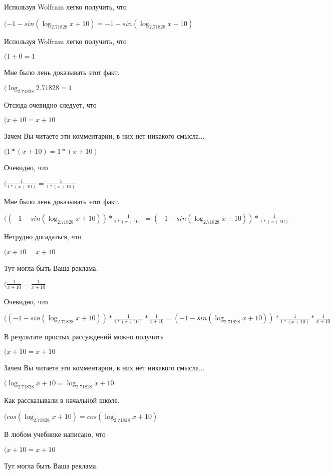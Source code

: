 \documentclass[12pt,a4paper,fleqn]{article}
\theoremstyle{definition}
\begin{document}
Используя Wolfram легко получить, что

$( -1  - sin(\log_{ 2.71828 }{ x  +  10 }) =  -1  - sin(\log_{ 2.71828 }{ x  +  10 })$

Используя Wolfram легко получить, что

$( 1  +  0  =  1 $

Мне было лень доказывать этот факт.

$(\log_{ 2.71828 }{ 2.71828 } =  1 $

Отсюда очевидно следует, что

$( x  +  10  =  x  +  10 $

Зачем Вы читаете эти комментарии, в них нет никакого смысла...

$( 1  * ( x  +  10 ) =  1  * ( x  +  10 )$

Очевидно, что

$(\frac{ 1 }{ 1  * ( x  +  10 )}
 = \frac{ 1 }{ 1  * ( x  +  10 )}
$

Мне было лень доказывать этот факт.

$(( -1  - sin(\log_{ 2.71828 }{ x  +  10 })) * \frac{ 1 }{ 1  * ( x  +  10 )}
 = ( -1  - sin(\log_{ 2.71828 }{ x  +  10 })) * \frac{ 1 }{ 1  * ( x  +  10 )}
$

Нетрудно догадаться, что

$( x  +  10  =  x  +  10 $

Тут могла быть Ваша реклама.

$(\frac{ 1 }{ x  +  10 }
 = \frac{ 1 }{ x  +  10 }
$

Очевидно, что

$(( -1  - sin(\log_{ 2.71828 }{ x  +  10 })) * \frac{ 1 }{ 1  * ( x  +  10 )}
 * \frac{ 1 }{ x  +  10 }
 = ( -1  - sin(\log_{ 2.71828 }{ x  +  10 })) * \frac{ 1 }{ 1  * ( x  +  10 )}
 * \frac{ 1 }{ x  +  10 }
$

В результате простых рассуждений можно получить

$( x  +  10  =  x  +  10 $

Зачем Вы читаете эти комментарии, в них нет никакого смысла...

$(\log_{ 2.71828 }{ x  +  10 } = \log_{ 2.71828 }{ x  +  10 }$

Как рассказывали в начальной школе,

$(cos(\log_{ 2.71828 }{ x  +  10 }) = cos(\log_{ 2.71828 }{ x  +  10 })$

В любом учебнике написано, что

$( x  +  10  =  x  +  10 $

Тут могла быть Ваша реклама.
\end{document}
